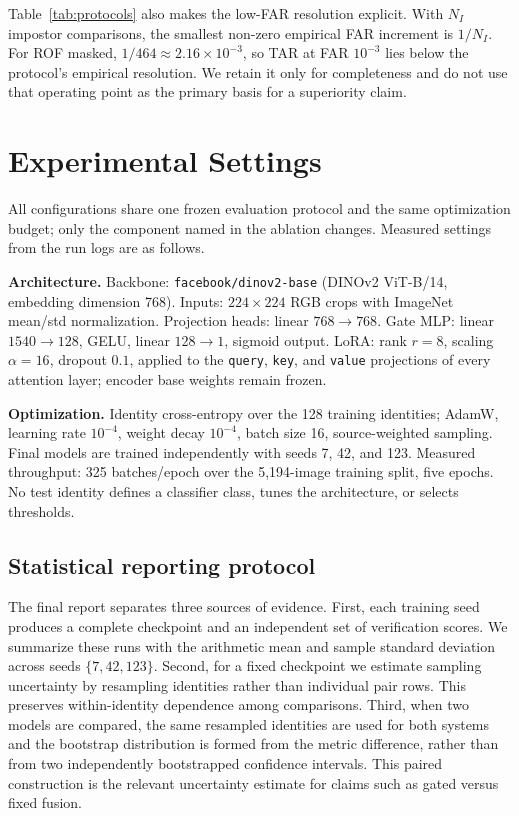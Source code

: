 ﻿\documentclass[10pt,journal,compsoc]{IEEEtran}
\begin{document}
Table~\ref{tab:protocols} also makes the low-FAR resolution explicit. With $N_I$ impostor comparisons, the smallest non-zero empirical FAR increment is $1/N_I$. For ROF masked, $1/464\approx2.16\times10^{-3}$, so TAR at FAR $10^{-3}$ lies below the protocol's empirical resolution. We retain it only for completeness and do not use that operating point as the primary basis for a superiority claim.

\section{Experimental Settings}
All configurations share one frozen evaluation protocol and the same optimization budget; only the component named in the ablation changes. Measured settings from the run logs are as follows.

\textbf{Architecture.} Backbone: \texttt{facebook/dinov2-base} (DINOv2 ViT-B/14, embedding dimension 768). Inputs: $224\times224$ RGB crops with ImageNet mean/std normalization. Projection heads: linear $768\rightarrow768$. Gate MLP: linear $1540\rightarrow128$, GELU, linear $128\rightarrow1$, sigmoid output. LoRA: rank $r=8$, scaling $\alpha=16$, dropout $0.1$, applied to the \texttt{query}, \texttt{key}, and \texttt{value} projections of every attention layer; encoder base weights remain frozen.

\textbf{Optimization.} Identity cross-entropy over the 128 training identities; AdamW, learning rate $10^{-4}$, weight decay $10^{-4}$, batch size 16, source-weighted sampling. Final models are trained independently with seeds 7, 42, and 123. Measured throughput: 325 batches/epoch over the 5,194-image training split, five epochs. No test identity defines a classifier class, tunes the architecture, or selects thresholds.

\subsection{Statistical reporting protocol}
The final report separates three sources of evidence. First, each training seed produces a complete checkpoint and an independent set of verification scores. We summarize these runs with the arithmetic mean and sample standard deviation across seeds $\{7,42,123\}$. Second, for a fixed checkpoint we estimate sampling uncertainty by resampling identities rather than individual pair rows. This preserves within-identity dependence among comparisons. Third, when two models are compared, the same resampled identities are used for both systems and the bootstrap distribution is formed from the metric difference, rather than from two independently bootstrapped confidence intervals. This paired construction is the relevant uncertainty estimate for claims such as gated versus fixed fusion.
\end{document}

